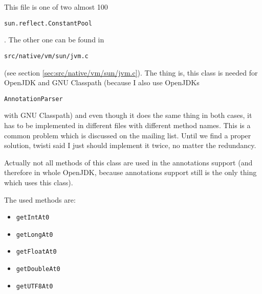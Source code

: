 \documentclass[a4paper, 10pt, titlepage]{scrartcl} %
\begin{document}
This file is one of two almost 100%
\begin{scriptsize}\verb|sun|\hspace{0.0pt}\verb|.|\hspace{0.0pt}\verb|reflect|\hspace{0.0pt}\verb|.|\hspace{0.0pt}\verb|ConstantPool|\end{scriptsize}. The other one can be found in
\begin{scriptsize}\verb|src|\hspace{0.0pt}\verb|/|\hspace{0.0pt}\verb|native|\hspace{0.0pt}\verb|/|\hspace{0.0pt}\verb|vm|\hspace{0.0pt}\verb|/|\hspace{0.0pt}\verb|sun|\hspace{0.0pt}\verb|/|\hspace{0.0pt}\verb|jvm|\hspace{0.0pt}\verb|.|\hspace{0.0pt}\verb|c|\end{scriptsize} (see section \ref{sec:src/native/vm/sun/jvm.c}). The thing is, this class is
needed for OpenJDK and GNU Classpath (because I also use OpenJDKs
\begin{scriptsize}\verb|AnnotationParser|\end{scriptsize} with GNU Classpath) and even though it does the same
thing in both cases, it has to be implemented in different files with different
method names. This is a common problem which is discussed on the mailing list.
Until we find a proper solution, twisti said I just should implement it twice,
no matter the redundancy.

Actually not all methods of this class are used in the annotations support
(and therefore in whole OpenJDK, because annotations support still is the only
thing which uses this class).

The used methods are:
\begin{itemize}
 \item \begin{scriptsize}\verb|getIntAt0|\end{scriptsize}
 \item \begin{scriptsize}\verb|getLongAt0|\end{scriptsize}
 \item \begin{scriptsize}\verb|getFloatAt0|\end{scriptsize}
 \item \begin{scriptsize}\verb|getDoubleAt0|\end{scriptsize}
 \item \begin{scriptsize}\verb|getUTF8At0|\end{scriptsize}
\end{itemize}
\end{document}
